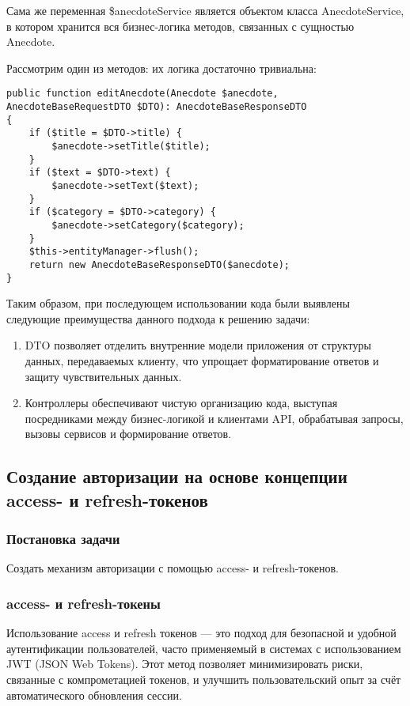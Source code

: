 \documentclass[pract]{SCWorks}
\begin{document}
Сама же переменная \$anecdoteService является объектом класса
AnecdoteService, в котором хранится вся бизнес-логика методов, связанных с 
сущностью Anecdote. 

Рассмотрим один из методов: их логика достаточно тривиальна:

\begin{verbatim}
public function editAnecdote(Anecdote $anecdote, AnecdoteBaseRequestDTO $DTO): AnecdoteBaseResponseDTO
{
    if ($title = $DTO->title) {
        $anecdote->setTitle($title);
    }
    if ($text = $DTO->text) {
        $anecdote->setText($text);
    }
    if ($category = $DTO->category) {
        $anecdote->setCategory($category);
    }
    $this->entityManager->flush();
    return new AnecdoteBaseResponseDTO($anecdote);
}
\end{verbatim}

Таким образом, при последующем использовании кода были выявлены следующие
преимущества данного подхода к решению задачи: 

\begin{enumerate}
    \item DTO позволяет отделить внутренние модели приложения от структуры 
    данных, передаваемых клиенту, что упрощает форматирование ответов и 
    защиту чувствительных данных.
    \item Контроллеры обеспечивают чистую организацию кода, выступая 
    посредниками между бизнес-логикой и клиентами API, обрабатывая запросы, 
    вызовы сервисов и формирование ответов.
\end{enumerate}

\subsection{Создание авторизации на основе концепции access- и refresh-токенов}
\subsubsection{Постановка задачи}
Создать механизм авторизации с помощью access- и refresh-токенов.

\subsubsection{access- и refresh-токены}

Использование access и refresh токенов — это подход для безопасной и 
удобной аутентификации пользователей, часто применяемый в системах с 
использованием JWT (JSON Web Tokens). Этот метод позволяет минимизировать 
риски, связанные с компрометацией токенов, и улучшить пользовательский опыт 
за счёт автоматического обновления сессии.
\end{document}
